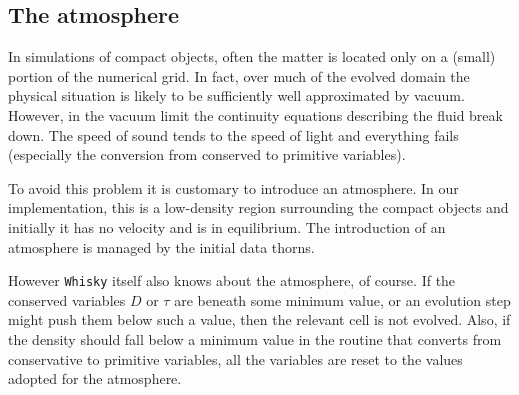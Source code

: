 \documentclass{article}
\begin{document}
\subsection{The atmosphere}
\label{sec:atmosphere}

In simulations of compact objects, often the matter is located only on a (small) portion of the
numerical grid. In fact, over much of the evolved domain the physical situation is likely to be
sufficiently well approximated by vacuum. However, in the vacuum limit the continuity equations
describing the fluid break down. The speed of sound tends to the speed of light and everything fails
(especially the conversion from conserved to primitive variables).

To avoid this problem it is customary to introduce an atmosphere. In our implementation, this is a
low-density region surrounding the compact objects and initially it has no velocity and is in equilibrium. The
introduction of an atmosphere is managed by the initial data thorns.

However {\tt Whisky} itself also knows about the atmosphere, of course. If the conserved variables
$D$ or $\tau$ are beneath some minimum value, or an evolution step might push them below such a
value, then the relevant cell is not evolved. Also, if the density should fall below a minimum value
in the routine that converts from conservative to primitive variables, all the variables are reset
to the values adopted for the atmosphere.
\end{document}
